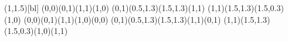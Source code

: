 \savebox{\cube}(1,1.5)[bl]{%
  \color{white}
  \polygon*(0,0)(0,1)(1,1)(1,0)
  \color{lightgray}
  \polygon*(0,1)(0.5,1.3)(1.5,1.3)(1,1)
  \color{gray}
  \polygon*(1,1)(1.5,1.3)(1.5,0.3)(1,0)
  \color{black}
  \polyline(0,0)(0,1)(1,1)(1,0)(0,0)
  \polyline(0,1)(0.5,1.3)(1.5,1.3)(1,1)(0,1)
  \polyline(1,1)(1.5,1.3)(1.5,0.3)(1,0)(1,1)
}
